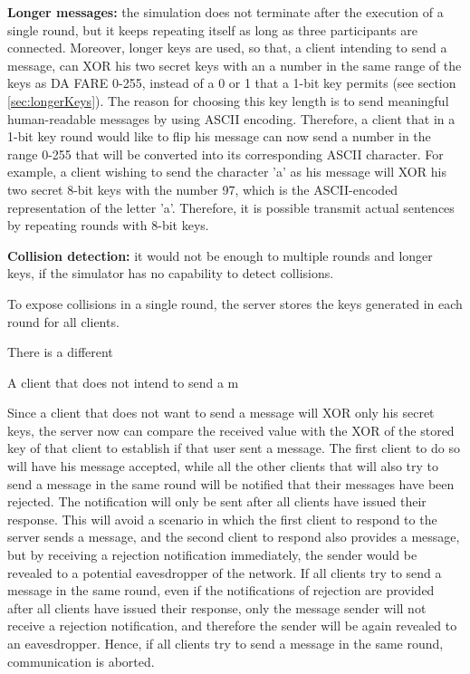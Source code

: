 \textbf{Longer messages:} the simulation does not terminate after the execution of a single round, but it keeps repeating itself as long as three participants are connected. Moreover, longer keys are used, so that, a client intending to send a message, can XOR his two secret keys with an a number in the same range of the keys as 
DA FARE 
0-255, instead of a 0 or 1 that a 1-bit key permits (see section \ref{sec:longerKeys}). The reason for choosing this key length is to send meaningful human-readable messages by using ASCII encoding. Therefore, a client that in a 1-bit key round would like to flip his message can now send a number in the range 0-255 that will be converted into its corresponding ASCII character. For example, a client wishing to send the character 'a' as his message will XOR his two secret 8-bit keys with the number 97, which is the ASCII-encoded representation of the letter 'a'. Therefore, it is possible transmit actual sentences by repeating rounds with 8-bit keys. \newline

\textbf{Collision detection:} it would not be enough to multiple rounds and longer keys, if the simulator has no capability to detect collisions. 

To expose collisions in a single round, the server stores the keys generated in each round for all clients. 

There is a different

A client that does not intend to send a m


Since a client that does not want to send a message will XOR only his secret keys, the server now can compare the received value with the XOR of the stored key of that client to establish if that user sent a message. The first client to do so will have his message accepted, while all the other clients that will also try to send a message in the same round will be notified that their messages have been rejected. The notification will only be sent after all clients have issued their response. This will avoid a scenario in which the first client to respond to the server sends a message, and the second client to respond also provides a message, but by receiving a rejection notification immediately, the sender would be revealed to a potential eavesdropper of the network. If all clients try to send a message in the same round, even if the notifications of rejection are provided after all clients have issued their response, only the message sender will not receive a rejection notification, and therefore the sender will be again revealed to an eavesdropper. Hence, if all clients try to send a message in the same round, communication is aborted.


